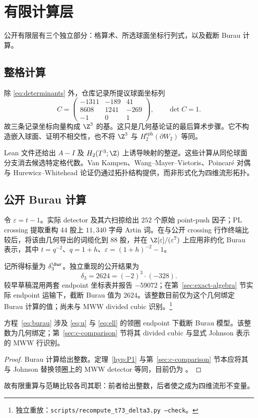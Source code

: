 \section{有限计算层}

公开有限层有三个独立部分：格算术、所选球面坐标行列式，以及截断 Burau 计算。

\subsection{整格计算}

除 \eqref{eq:determinants} 外，仓库记录所提议球面坐标列
\begin{equation}\label{eq:spherecols}
C=\begin{pmatrix}
-1311&-189&41\\
8608&1241&-269\\
-1&0&1
\end{pmatrix},
\qquad \det C=1.
\end{equation}
故三条记录坐标向量构成 $\Z^3$ 的基。这只是几何基论证的最后算术步骤。它不构造嵌入球面、证明不相交性，也不将 $\Z^3$ 与 $H_2^{\mathrm{sph}}(\partial W_2)$ 等同。

Lean 文件还给出 $A-I$ 及 $H_2(T^3;\Z)$ 上诱导映射的整逆。这些计算从同伦球面分支消去候选特定格代数。Van Kampen、Wang--Mayer--Vietoris、Poincaré 对偶与 Hurewicz--Whitehead 论证仍通过拓扑结构提供，而非形式化为四维流形拓扑。

\subsection{公开 Burau 计算}

令 $\varepsilon=t-1$。实际 detector 及其六扫掠给出 $252$ 个原始 point-push 因子；PL crossing 提取重构 $44$ 股上 $11{,}340$ 字母 Artin 词。在与公开 crossing 行作终端比较后，将该由几何导出的词缆化到 $88$ 股，并在 $\Z[\varepsilon]/(\varepsilon^7)$ 上应用非约化 Burau 表示，其中 $t=q^{-2}$、$q=1+h$、$\varepsilon=(1+h)^{-2}-1$。

记所得标量为 $\delta_3^{\Bur}$。独立重现的公开结果为
\begin{equation}\label{eq:burau}
\delta_3=2624=(-2)^3\cdot(-328).
\end{equation}
较早草稿混用两套 endpoint 坐标表并报告 $-59072$；在第~\ref{sec:exact-algebra} 节实际 endpoint 运输下，截断 Burau 值为 $2624$。该整数目前仅为这个几何绑定 Burau 计算的值；尚未与 MWW divided cubic 识别。\footnote{独立重放：\texttt{scripts/recompute\_t73\_delta3.py --check}。}

\begin{proposition}[计算的精确适用范围]\label{prop:scope}
方程~\eqref{eq:burau} 涉及 \eqref{eq:u} 与 \eqref{eq:ell} 的领圈 endpoint 下截断 Burau 模型。该整数为几何绑定；第~\ref{sec:c-comparison} 节将其 divided cubic 与显式 Johnson 表示的 MWW 行识别。
\end{proposition}

\begin{proof}
Burau 计算给出整数。定理~\ref{hyp:P1} 与第~\ref{sec:c-comparison} 节本应将其与 Johnson 替换领圈上的 MWW detector 等同，目前仍为 \Open。
\end{proof}

故有限重算与范畴比较各司其职：前者给出整数，后者使之成为四维流形不变量。


